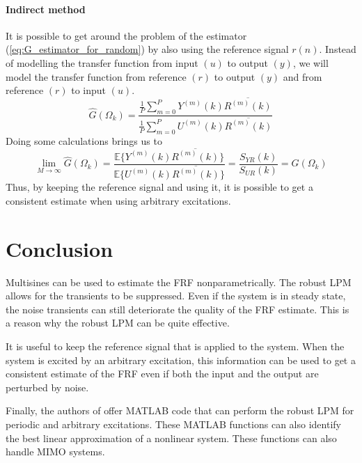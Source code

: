 \paragraph{Indirect method}
It is possible to get around the problem of the estimator (\ref{eq:G_estimator_for_random}) by also using the reference signal $r(n)$. Instead of modelling the transfer function from input $(u)$ to output $(y)$, we will model the transfer function from reference $(r)$ to output $(y)$ and from reference $(r)$ to input $(u)$.
\begin{equation}
    \hat G(\Omega_k) = \frac{ \frac{1}{P}\sum_{m=0}^P Y^{(m)}(k) \overline{R^{(m)}(k)} } { \frac{1}{P}\sum_{m=0}^P U^{(m)}(k) \overline{R^{(m)}(k)} }
    \label{eq:G_estimator_for_random_indirect}
\end{equation}
Doing some calculations brings us to
\begin{equation*}
    \lim_{M\rightarrow\infty} \hat G(\Omega_k) = \frac{ \mathbb{E}\{ Y^{(m)}(k) \overline{R^{(m)}(k)}\}} { \mathbb{E}\{ U^{(m)}(k) \overline{R^{(m)}(k)} \}} = \frac{ S_{Y\!R}(k)} { S_{U\!R}(k)} = G(\Omega_k)
\end{equation*}
Thus, by keeping the reference signal and using it, it is possible to get a consistent estimate when using arbitrary excitations.

\newpage
\section{Conclusion}
Multisines can be used to estimate the FRF nonparametrically. The robust LPM allows for the transients to be suppressed. Even if the system is in steady state, the noise transients can still deteriorate the quality of the FRF estimate. This is a reason why the robust LPM can be quite effective.

It is useful to keep the reference signal that is applied to the system. When the system is excited by an arbitrary excitation, this information can be used to get a consistent estimate of the FRF even if both the input and the output are perturbed by noise.

Finally, the authors of \cite{pintelon_book} offer MATLAB code that can perform the robust LPM for periodic and arbitrary excitations. These MATLAB functions can also identify the best linear approximation of a nonlinear system. These functions can also handle MIMO systems.


